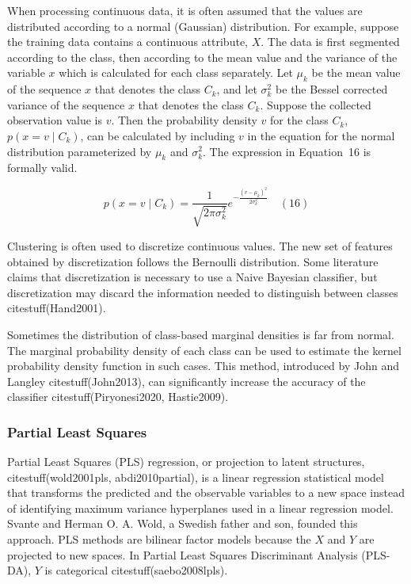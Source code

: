 \documentclass[preprint,12pt]{elsarticle}
\begin{document}
When processing continuous data, it is often assumed that the values are distributed according to a normal (Gaussian) distribution. For example, suppose the training data contains a continuous attribute, $X$. The data is first segmented according to the class, then according to the mean value and the variance of the variable $x$ which is calculated for each class separately. Let $\mu_{k}$ be the mean value of the sequence $x$ that denotes the class $C_{k}$, and let $\sigma_{k}^{2}$ be the Bessel corrected variance of the sequence $x$ that denotes the class $C_{k}$. Suppose the collected observation value is $v$. Then the probability density $v$ for the class $C_{k}$, $p(x=v\mid C_{k})$, can be calculated by including $v$ in the equation for the normal distribution parameterized by $\mu_{k}$ and $\sigma_{k}^{2}$. The expression in Equation~16 is formally valid.

\begin{equation}
	p(x=v\mid C_{k}) = \frac{1}{\sqrt{2\pi \sigma_{k}^{2}}} e^{-\frac{{(v-\mu_{k})}^{2}}{2\sigma_{k}^{2}}}
	\quad\left(16\right)
\end{equation}

Clustering is often used to discretize continuous values. The new set of features obtained by discretization follows the Bernoulli distribution. Some literature claims that discretization is necessary to use a Naive Bayesian classifier, but discretization may discard the information needed to distinguish between classes citestuff(Hand2001).

Sometimes the distribution of class-based marginal densities is far from normal. The marginal probability density of each class can be used to estimate the kernel probability density function in such cases. This method, introduced by John and Langley citestuff(John2013), can significantly increase the accuracy of the classifier citestuff(Piryonesi2020, Hastie2009).

\subsubsection{Partial Least Squares}

Partial Least Squares (PLS) regression, or projection to latent structures, citestuff(wold2001pls, abdi2010partial), is a linear regression statistical model that transforms the predicted and the observable variables to a new space instead of identifying maximum variance hyperplanes used in a linear regression model. Svante and Herman O. A. Wold, a Swedish father and son, founded this approach. PLS methods are bilinear factor models because the $X$ and $Y$ are projected to new spaces. In Partial Least Squares Discriminant Analysis (PLS-DA), $Y$ is categorical citestuff(saebo2008lpls).
\end{document}
